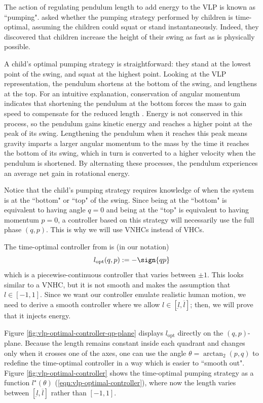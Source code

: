 The action of regulating pendulum length to add energy to the VLP is known as
``pumping". \citet{pumping_swing_standing_squatting} asked whether
the pumping strategy performed by children is time-optimal, assuming the
children could squat or stand instantaneously. 
Indeed, they discovered that children increase the height of their swing as fast
as is physically possible.

A child's optimal pumping strategy is straightforward:
they stand at the lowest point of the swing, and squat at the highest point.
Looking at the VLP representation, the pendulum shortens at the bottom of the
swing, and lengthens at the top. 
For an intuitive explanation, conservation of angular momentum indicates that
shortening the pendulum at the bottom forces the mass to gain speed to
compensate for the reduced length \cite{how_to_pump_a_swing}.
Energy is not conserved in this process, so the pendulum gains kinetic energy
and reaches a higher point at the peak of its swing.
Lengthening the pendulum when it reaches this peak means gravity
imparts a larger angular momentum to the mass by the time it reaches the bottom
of its swing, which in turn is converted to a higher velocity when the
pendulum is shortened.
By alternating these processes, the pendulum experiences an average net gain in
rotational energy.

Notice that the child's pumping strategy requires knowledge of
when the system is at the ``bottom" or ``top" of the swing. 
Since being at the ``bottom" is equivalent to having angle \(q = 0\) and being
at the ``top" is equivalent to having momentum \(p = 0\), a controller based on
this strategy will necessarily use the full phase \((q,p)\). 
This is why we will use VNHCs instead of VHCs.

The time-optimal controller from \cite{pumping_swing_standing_squatting} is (in
our notation)
\[
   l_\text{opt}(q,p) := -\sign{qp}
\]
which is a piecewise-continuous controller that varies between \(\pm 1\). 
This looks similar to a VNHC, but it is not smooth and makes the assumption that 
\(l \in [-1,1]\). 
Since we want our controller emulate realistic human motion, we need to derive a
smooth controller where we allow \(l \in [\underbar{l},\overbar{l}]\); then, we
will prove that it injects energy.

Figure \ref{fig:vlp-optimal-controller-qp-plane} displays \(l_\text{opt}\) 
directly on the \((q,p)\)-plane.
Because the length remains constant inside each quadrant and changes only when it
crosses one of the axes, one can use the angle \(\theta = \arctan_2(p,q)\) to
redefine the time-optimal controller in a way which is easier to ``smooth out".
Figure \ref{fig:vlp-optimal-controller} shows the time-optimal pumping strategy
as a function \(l^\star(\theta)\) (\ref{eqn:vlp-optimal-controller}), where now
the length varies between \([\underbar{l},\overbar{l}]\) rather than 
\([-1,1]\). 

